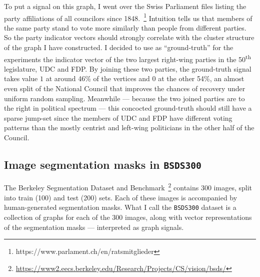 To put a signal on this graph, I went over the Swiss Parliament files listing the party affiliations of all councilors since 1848.~\footnote{https://www.parlament.ch/en/ratsmitglieder} Intuition tells us that members of the same party stand to vote more similarly than people from different parties. So the party indicator vectors should strongly correlate with the cluster structure of the graph I have constructed. I decided to use as ``ground-truth'' for the experiments the indicator vector of the two largest right-wing parties in the 50\textsuperscript{th} legislature, UDC and FDP. By joining these two parties, the ground-truth signal takes value $1$ at around 46\% of the vertices and $0$ at the other 54\%, an almost even split of the National Council that improves the chances of recovery under uniform random sampling. Meanwhile --- because the two joined parties are to the right in political spectrum --- this concocted ground-truth should still have a sparse jump-set since the members of UDC and FDP have different voting patterns than the mostly centrist and left-wing politicians in the other half of the Council.

\subsection{Image segmentation masks in \texttt{BSDS300}}

The Berkeley Segmentation Dataset and Benchmark~\footnote{\url{https://www2.eecs.berkeley.edu/Research/Projects/CS/vision/bsds/}} contains 300 images, split into train (100)  and test (200) sets. Each of these images is accompanied by human-generated segmentation masks. What I call the \texttt{BSDS300} dataset is a collection of graphs for each of the 300 images, along with vector representations of the segmentation masks --- interpreted as graph signals.

